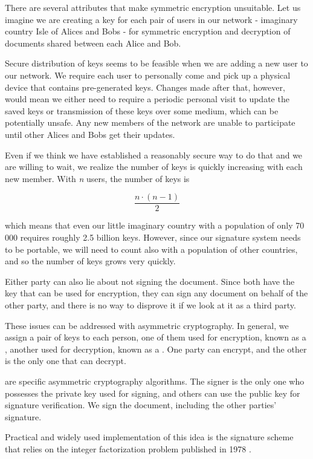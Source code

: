 \documentclass[thesismargins, english, thesislinespacing, onelinechapterstyle, upjsfrontpage]{rnthesis}
\begin{document}
There are several attributes that make symmetric encryption unsuitable.
Let us imagine we are creating a key for each pair of users in our network - imaginary country Isle of Alices and Bobs - for symmetric encryption and decryption of documents shared between each Alice and Bob.

Secure distribution of keys seems to be feasible when we are adding a new user to our network.
We require each user to personally come and pick up a physical device that contains pre-generated keys.
Changes made after that, however, would mean we either need to require a periodic personal visit to update the saved keys or transmission of these keys over some medium, which can be potentially unsafe.
Any new members of the network are unable to participate until other Alices and Bobs get their updates.

Even if we think we have established a reasonably secure way to do that and we are willing to wait, we realize the number of keys is quickly increasing with each new member. With \textit{n} users, the number of keys is

$$\frac{n \cdot (n - 1)}{2}$$

which means that even our little imaginary country with a population of only 70 000 requires roughly 2.5 billion keys. However, since our signature system needs to be portable, we will need to count also with a population of other countries, and so the number of keys grows very quickly.

Either party can also lie about not signing the document.
Since both have the key that can be used for encryption, they can sign any document on behalf of the other party, and there is no way to disprove it if we look at it as a third party.

These issues can be addressed with asymmetric cryptography.
In general, we assign a pair of keys to each person, one of them used for encryption, known as a , another used for decryption, known as a .
One party can encrypt, and the other is the only one that can decrypt.

 are specific asymmetric cryptography algorithms.
The signer is the only one who possesses the private key used for signing, and others can use the public key for signature verification.
We sign the document, including the other parties' signature.

Practical and widely used implementation of this idea is the  signature scheme that relies on the integer factorization problem published in 1978 \cite{rsa}.
\end{document}
